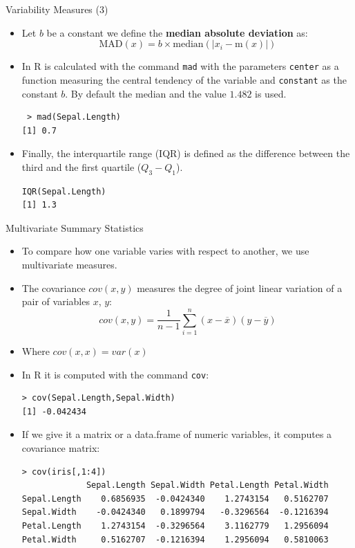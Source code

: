 \documentclass[handout]{beamer}
\begin{document}
\begin{frame}[fragile]{Variability Measures (3)}
\scriptsize{ 
\begin{itemize}
 \item Let $b$ be a constant we define the \textbf{median absolute deviation} as: 
 \begin{displaymath}
  \text{MAD}(x) = b \times \text{median}(|x_{i}-\text{m}(x)|)
 \end{displaymath}
 \item In R is calculated with the command \verb+mad+ with the parameters \verb+center+ as a function measuring the central tendency of the variable and \verb+constant+ as the constant $b$. By default the median and the value $1.482$ is used. 
 \begin{verbatim}
 > mad(Sepal.Length)
[1] 0.7 
 \end{verbatim}

 \item Finally, the interquartile range (IQR) is defined as the difference between the third and the first quartile ($Q_3 - Q_1$).
 \begin{verbatim}
IQR(Sepal.Length)
[1] 1.3  
 \end{verbatim}

\end{itemize}
  
} 
\end{frame}



\begin{frame}[fragile]{Multivariate Summary Statistics}
\scriptsize{
\begin{itemize}
 \item To compare how one variable varies with respect to another, we use multivariate measures.
 \item The covariance $cov(x,y)$ measures the degree of joint linear variation of a pair of variables $x$, $y$:
 \begin{displaymath}
  cov(x,y)=\frac{1}{n-1}\sum_{i=1}^{n}(x-\overline{x})(y-\overline{y})
 \end{displaymath}
 \item Where $cov(x,x)=var(x)$
\item In R it is computed with the command  \verb+cov+:
\begin{verbatim}
> cov(Sepal.Length,Sepal.Width)
[1] -0.042434 
\end{verbatim}
\item If we give it a matrix or a data.frame of numeric variables, it computes a covariance matrix:
\begin{verbatim}
> cov(iris[,1:4])
             Sepal.Length Sepal.Width Petal.Length Petal.Width
Sepal.Length    0.6856935  -0.0424340    1.2743154   0.5162707
Sepal.Width    -0.0424340   0.1899794   -0.3296564  -0.1216394
Petal.Length    1.2743154  -0.3296564    3.1162779   1.2956094
Petal.Width     0.5162707  -0.1216394    1.2956094   0.5810063 
\end{verbatim}

 
 
 
\end{itemize}



}
\end{frame}
\end{document}
